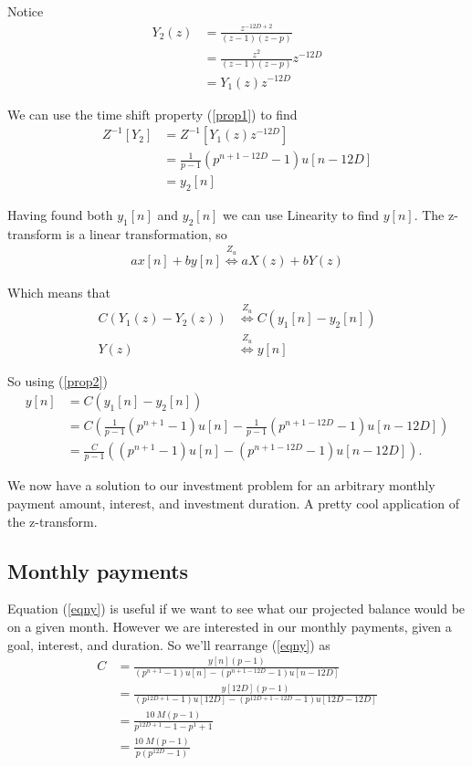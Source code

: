 \documentclass[letterpaper]{article}
\begin{document}
Notice 
\begin{align}
	Y_2(z) &= \frac{z^{-12D+2}}{(z-1)(z - p)} \\
	       &= \frac{z^{2}}{(z-1)(z - p)}z^{-12D} \\
	       &= Y_1(z) z^{-12D}
\end{align}

We can use the time shift property (\ref{prop1}) to find 
\begin{align}
	Z^{-1}\left[Y_2\right] &= Z^{-1}\left[Y_1(z) z^{-12D}\right] \\
						   &= \frac{1}{p - 1}\left(p^{n+1-12D} - 1 \right)u[n-12D] \\
						   &= y_2[n]
\end{align}

Having found both $y_1[n]$ and $y_2[n]$ we can use Linearity to find $y[n]$. The z-transform is a linear transformation, so 
\begin{align}
	ax[n] + by[n] \stackrel{Z_u}{\Longleftrightarrow} aX(z) + bY(z) \label{prop2}
\end{align}

Which means that 
\begin{align}
	C \left(Y_1(z) - Y_2(z) \right) &\stackrel{Z_u}{\Longleftrightarrow} C \left(y_1[n] - y_2[n] \right) \\
	Y(z) &\stackrel{Z_u}{\Longleftrightarrow} y[n]
\end{align}

So using (\ref{prop2})
\begin{align}
	y[n] &= C(y_1[n] - y_2[n]) \\
		 &= C \left(\frac{1}{p - 1}\left(p^{n+1} - 1 \right)u[n] - \frac{1}{p - 1}\left(p^{n+1-12D} - 1 \right)u[n-12D] \right) \\
		 &= \frac{C}{p - 1}\left(\left(p^{n+1} - 1 \right)u[n] - \left(p^{n+1-12D} - 1 \right)u[n-12D] \right). \label{eqny}
\end{align}

We now have a solution to our investment problem for an arbitrary monthly payment amount, interest, and investment duration. A pretty cool application of the z-transform. 

\subsection{Monthly payments}
Equation (\ref{eqny}) is useful if we want to see what our projected balance would be on a given month. However we are interested in our monthly payments, given a goal, interest, and duration. So we'll rearrange (\ref{eqny}) as
\begin{align}
	C &= \frac{y[n](p - 1)}{\left(p^{n+1} - 1 \right)u[n] - \left(p^{n+1-12D} - 1 			\right)u[n-12D]} \\
	  &= \frac{y[12D](p - 1)}{\left(p^{12D+1} - 1 \right)u[12D] - \left(p^{12D+1-12D} - 1 \right)u[12D-12D]} \\
	  &= \frac{\SI{10}{M}(p - 1)}{p^{12D+1} - 1 - p^1 + 1} \\
	  &= \frac{\SI{10}{M}(p - 1)}{p\left(p^{12D} - 1\right)}
\end{align}
\end{document}

